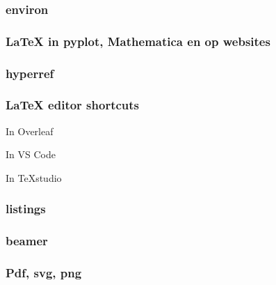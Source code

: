 \documentclass{cursuspresentatie}
\def\importslide#1#2{%
    {#2}
}
\begin{document}
    \begin{frame}
        \frametitle{environ}
    \end{frame}

    \begin{frame}
        \frametitle{LaTeX in pyplot, Mathematica en op websites}
    \end{frame}

    \begin{frame}
        \frametitle{hyperref}
    \end{frame}

    \begin{frame}
        \frametitle{LaTeX editor shortcuts}

        In Overleaf

        In VS Code

        In TeXstudio
    \end{frame}

    \begin{frame}
        \frametitle{listings}
    \end{frame}

    \begin{frame}
        \frametitle{beamer}
    \end{frame}

    \begin{frametitle}
        \frametitle{Pdf, svg, png}
    \end{frametitle}















    



\end{document}
